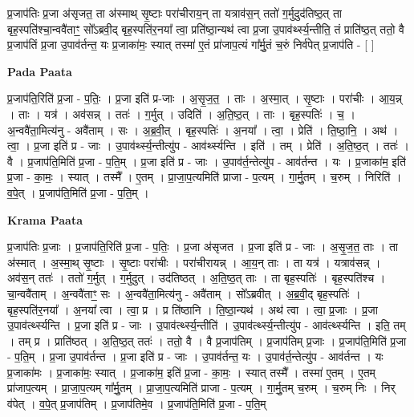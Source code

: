 \documentclass[17pt]{extarticle}
\begin{document}
प्र॒जाप॑तिः प्र॒जा अ॑सृजत॒ ता अ॑स्माथ् सृ॒ष्टाः परा॑चीराय॒न् ता यत्राव॑स॒न् ततो॑ ग॒र्मुदुद॑तिष्ठ॒त् ता बृह॒स्पति॑श्चा॒न्ववै॑ताꣳ॒॒ सो᳚ऽब्रवी॒द् बृह॒स्पति॑र॒नया᳚ त्वा॒ प्रति॑ष्ठा॒न्यथ॑ त्वा प्र॒जा उ॒पाव॑र्थ्स्य॒न्तीति॒ तं प्राति॑ष्ठ॒त् ततो॒ वै प्र॒जाप॑तिं प्र॒जा उ॒पाव॑र्तन्त॒ यः प्र॒जाका॑मः॒ स्यात् तस्मा॑ ए॒तं प्रा॑जाप॒त्यं गा᳚र्मु॒तं च॒रुं निर्व॑पेत् प्र॒जाप॑ति - [  ] \newline

\textbf{Pada Paata} \newline

प्र॒जाप॑ति॒रिति॑ प्र॒जा - प॒तिः॒ । प्र॒जा इति॑ प्र-जाः । अ॒सृ॒ज॒त॒ । ताः । अ॒स्मा॒त् । सृ॒ष्टाः । परा॑चीः । आ॒य॒न्न् । ताः । यत्र॑ । अव॑सन्न् । ततः॑ । ग॒र्मुत् । उदिति॑ । अ॒ति॒ष्ठ॒त् । ताः । बृह॒स्पतिः॑ । च॒ । अ॒न्ववै॑ता॒मित्य॑नु - अवै॑ताम् । सः । अ॒ब्र॒वी॒त् । बृह॒स्पतिः॑ । अ॒नया᳚ । त्वा॒ । प्रेति॑ । ति॒ष्ठा॒नि॒ । अथ॑ । त्वा॒ । प्र॒जा इति॑ प्र - जाः । उ॒पाव॑र्थ्स्य॒न्तीत्यु॑प - आव॑र्थ्स्यन्ति । इति॑ । तम् । प्रेति॑ । अ॒ति॒ष्ठ॒त् । ततः॑ । वै । प्र॒जाप॑ति॒मिति॑ प्र॒जा - प॒ति॒म् । प्र॒जा इति॑ प्र - जाः । उ॒पाव॑र्त॒न्तेत्यु॑प - आव॑र्तन्त । यः । प्र॒जाका॑म॒ इति॑ प्र॒जा - का॒मः॒ । स्यात् । तस्मै᳚ । ए॒तम् । प्रा॒जा॒प॒त्यमिति॑ प्राजा - प॒त्यम् । गा॒र्मु॒तम् । च॒रुम् । निरिति॑ । व॒पे॒त् । प्र॒जाप॑ति॒मिति॑ प्र॒जा - प॒ति॒म् ।  \newline


\textbf{Krama Paata} \newline

प्र॒जाप॑तिः प्र॒जाः । प्र॒जाप॑ति॒रिति॑ प्र॒जा - प॒तिः॒ । प्र॒जा अ॑सृजत । प्र॒जा इति॑ प्र - जाः । अ॒सृ॒ज॒त॒ ताः । ता अ॑स्मात् । अ॒स्मा॒थ् सृ॒ष्टाः । सृ॒ष्टाः परा॑चीः । परा॑चीरायन्न् । आ॒य॒न् ताः । ता यत्र॑ । यत्राव॑सन्न् । अव॑स॒न् ततः॑ । ततो॑ ग॒र्मुत् । ग॒र्मुदुत् । उद॑तिष्ठत् । 
अ॒ति॒ष्ठ॒त् ताः । ता बृह॒स्पतिः॑ । बृह॒स्पति॑श्च । चा॒न्ववै॑ताम् । अ॒न्ववै॑ताꣳ॒॒ सः । अ॒न्ववै॑ता॒मित्य॑नु - अवै॑ताम् । सो᳚ऽब्रवीत् । अ॒ब्र॒वी॒द् बृह॒स्पतिः॑ । बृह॒स्पति॑र॒नया᳚ । अ॒नया᳚ त्वा । त्वा॒ प्र । प्र ति॑ष्ठानि । ति॒ष्ठा॒न्यथ॑ । अथ॑ त्वा । त्वा॒ प्र॒जाः । प्र॒जा उ॒पाव॑र्त्थ्स्यन्ति । प्र॒जा इति॑ प्र - जाः । उ॒पाव॑र्त्थ्स्य॒न्तीति॑ । उ॒पाव॑र्त्थ्स्य॒न्तीत्यु॑प - आव॑र्त्थ्स्यन्ति । इति॒ तम् । तम् प्र । प्राति॑ष्ठत् । अ॒ति॒ष्ठ॒त् ततः॑ । ततो॒ वै । वै प्र॒जाप॑तिम् । प्र॒जाप॑तिम् प्र॒जाः । प्र॒जाप॑ति॒मिति॑ प्र॒जा - प॒ति॒म् । प्र॒जा उ॒पाव॑र्तन्त । प्र॒जा इति॑ प्र - जाः । उ॒पाव॑र्तन्त॒ यः । उ॒पाव॑र्त॒न्तेत्यु॑प - आव॑र्तन्त । यः प्र॒जाका॑मः । प्र॒जाका॑मः॒ स्यात् । प्र॒जाका॑म॒ इति॑ प्र॒जा - का॒मः॒ । स्यात् तस्मै᳚ । तस्मा॑ ए॒तम् । ए॒तम् प्रा॑जाप॒त्यम् । प्रा॒जा॒प॒त्यम् गा᳚र्मु॒तम् । प्रा॒जा॒प॒त्यमिति॑ प्राजा - प॒त्यम् । गा॒र्मु॒तम् च॒रुम् । च॒रुम् निः । निर् व॑पेत् । व॒पे॒त् प्र॒जाप॑तिम् । प्र॒जाप॑तिमे॒व । 
प्र॒जाप॑ति॒मिति॑ प्र॒जा - प॒ति॒म् \newline
\end{document}
